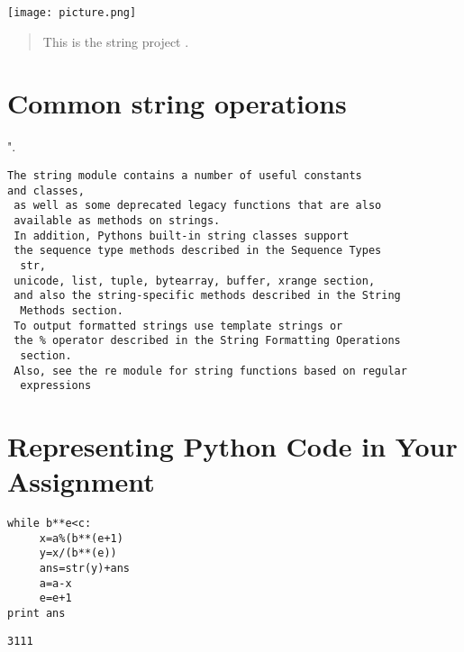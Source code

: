 \begin{marginfigure}%
  \texttt{[image: picture.png]}

\end{marginfigure}
\begin{abstract}
\noindent
This is the string project   .
\end{abstract}

\normalsize

\vspace{1cm}
\section{ Common string operations}

".


\begin{shaded}
\begin{verbatim}
The string module contains a number of useful constants
and classes,
 as well as some deprecated legacy functions that are also
 available as methods on strings.
 In addition, Pythons built-in string classes support 
 the sequence type methods described in the Sequence Types 
  str,
 unicode, list, tuple, bytearray, buffer, xrange section,
 and also the string-specific methods described in the String
  Methods section.
 To output formatted strings use template strings or 
 the % operator described in the String Formatting Operations
  section.
 Also, see the re module for string functions based on regular
  expressions
\end{verbatim}
\end{shaded}

\vspace{1cm}

\section{Representing Python Code in Your Assignment}


\begin{framed}
\begin{verbatim}
while b**e<c:
     x=a%(b**(e+1)
     y=x/(b**(e))
     ans=str(y)+ans
     a=a-x
     e=e+1
print ans

\end{verbatim}
\end{framed}

\marginnote[40pt]

\begin{shaded}
\begin{verbatim}
3111
\end{verbatim}
\end{shaded}
